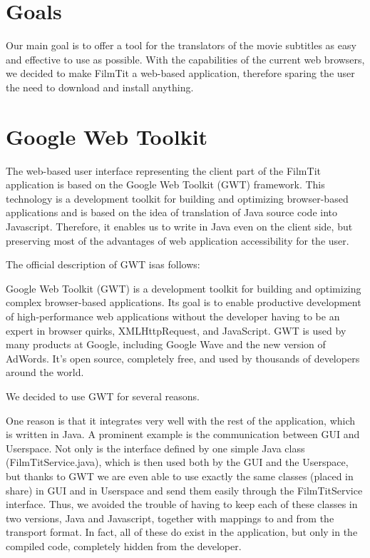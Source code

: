 
\section{Goals}
Our main goal is to offer a tool for the translators of the movie subtitles as easy and effective to use as possible. With the capabilities of the current web browsers, we decided to make FilmTit a web-based application, therefore sparing the user the need to download and install anything.

\section{Google Web Toolkit}
The web-based user interface representing the client part of the FilmTit application is based on the Google Web Toolkit (GWT) framework. This technology is a development toolkit for building and optimizing browser-based applications %
and is based on the idea of translation of Java source code into Javascript. Therefore, it enables us to write in Java even on the client side, but preserving most of the advantages of web application accessibility for the user.

The official description of GWT isas follows:

Google Web Toolkit (GWT) is a development toolkit for building and optimizing complex browser-based applications. Its goal is to enable productive development of high-performance web applications without the developer having to be an expert in browser quirks, XMLHttpRequest, and JavaScript. GWT is used by many products at Google, including Google Wave and the new version of AdWords. It's open source, completely free, and used by thousands of developers around the world.


We decided to use GWT for several reasons.

One reason is that it integrates very well with the rest of the application, which is written in Java. A prominent example is the communication between GUI and Userspace. Not only is the interface defined by one simple Java class (FilmTitService.java), which is then used both by the GUI and the Userspace, but thanks to GWT we are even able to use exactly the same classes (placed in share) in GUI and in Userspace and send them easily through the FilmTitService interface. Thus, we avoided the trouble of having to keep each of these classes in two versions, Java and Javascript, together with mappings to and from the transport format. In fact, all of these do exist in the application, but only in the compiled code, completely hidden from the developer.

